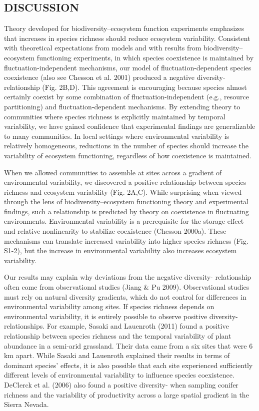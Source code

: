 \documentclass[12pt,]{article}
\begin{document}
\subsection{DISCUSSION}\label{discussion}

Theory developed for biodiversity--ecosystem function experiments
emphasizes that increases in species richness should reduce ecosystem
variability. Consistent with theoretical expectations from models and
with results from biodiversity--ecosystem functioning experiments, in
which species coexistence is maintained by fluctuation-independent
mechanisms, our model of fluctuation-dependent species coexistence (also
see Chesson et al. 2001) produced a negative
diversity- relationship (Fig. 2B,D). This
agreement is encouraging because species almost certainly coexist by
some combination of fluctuation-independent (e.g., resource
partitioning) and fluctuation-dependent mechanisms. By extending theory
to communities where species richness is explicitly maintained by
temporal variability, we have gained confidence that experimental
findings are generalizable to many communities. In local settings where
environmental variability is relatively homogeneous, reductions in the
number of species should increase the variability of ecosystem
functioning, regardless of how coexistence is maintained.

When we allowed communities to assemble at sites across a gradient of
environmental variability, we discovered a positive relationship between
species richness and ecosystem variability (Fig. 2A,C). While surprising
when viewed through the lens of biodiversity--ecosystem functioning
theory and experimental findings, such a relationship is predicted by
theory on coexistence in fluctuating environments. Environmental
variability is a prerequisite for the storage effect and relative
nonlinearity to stabilize coexistence (Chesson 2000a). These mechanisms
can translate increased variability into higher species richness (Fig.
S1-2), but the increase in environmental variability also increases
ecosystem variability.

Our results may explain why deviations from the negative
diversity- relationship often come from
observational studies (Jiang \& Pu 2009). Observational studies must
rely on natural diversity gradients, which do not control for
differences in environmental variability among sites. If species
richness depends on environmental variability, it is entirely possible
to observe positive diversity- relationships.
For example, Sasaki and Lauenroth (2011) found a positive relationship
between species richness and the temporal variability of plant abundance
in a semi-arid grassland. Their data came from a six sites that were 6
km apart. While Sasaki and Lauenroth explained their results in terms of
dominant species' effects, it is also possible that each site
experienced sufficiently different levels of environmental variability
to influence species coexistence. DeClerck et al. (2006) also found a
positive diversity- when sampling conifer
richness and the variability of productivity across a large spatial
gradient in the Sierra Nevada.
\end{document}
